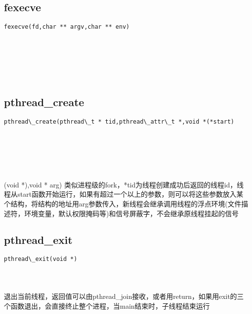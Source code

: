 \documentclass[10pt,a4paper]{article}
\begin{document}
\subsection{fexecve}
\begin{spacing}{2.0}
\lstset{language=C,numbers=none}
\begin{lstlisting}
fexecve(fd,char ** argv,char ** env)
\end{lstlisting}
{\large\color[rgb]{0.2,0.4,0.6}{fd:}} \\
{\large\color[rgb]{0.2,0.4,0.6}{argv:}} \\
{\large\color[rgb]{0.2,0.4,0.6}{env:}}
\paragraph{ \ \ }
\end{spacing}

\section{\color[rgb]{0.2,0.4,0.6}{线程}}
\subsection{pthread\_create}
\begin{spacing}{2.0}
\lstset{language=C,numbers=none}
\begin{lstlisting}
pthread\_create(pthread\_t * tid,pthread\_attr\_t *,void *(*start)
\end{lstlisting}
{\large\color[rgb]{0.2,0.4,0.6}{tid:}} \\
{\large\color[rgb]{0.2,0.4,0.6}{*:}} \\
{\large\color[rgb]{0.2,0.4,0.6}{*(*start:}}
\paragraph{ \ \ }(void *),void * arg) 类似进程级的fork，*tid为线程创建成功后返回的线程id，线程从start函数开始运行，如果有超过一个以上的参数，则可以将这些参数放入某个结构，将结构的地址用arg参数传入，新线程会继承调用线程的浮点环境(文件描述符，环境变量，默认权限掩码等)和信号屏蔽字，不会继承原线程挂起的信号
\end{spacing}

\subsection{pthread\_exit}
\begin{spacing}{2.0}
\lstset{language=C,numbers=none}
\begin{lstlisting}
pthread\_exit(void *)
\end{lstlisting}
{\large\color[rgb]{0.2,0.4,0.6}{*:}}
\paragraph{ \ \ }退出当前线程，返回值可以由pthread\_join接收，或者用return，如果用exit的三个函数退出，会直接终止整个进程，当main结束时，子线程结束运行
\end{spacing}
\end{document}
